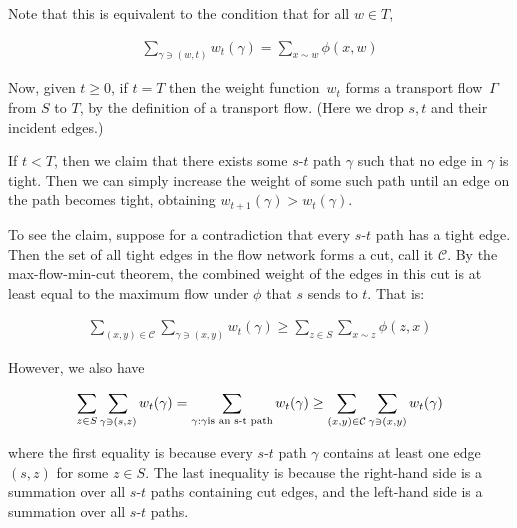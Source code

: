 \documentclass[10pt,a4paper]{article}
\begin{document}
Note that this is equivalent to the condition that for all $w\in T$,\par


\[\begin{gathered}
\sum_{\gamma\ni(w,t)}w_{t}(\gamma)=\sum_{x\sim w}\phi(x,w)
\end{gathered}\]




Now, given $t\geq 0$, if $t=T$ then the weight function $w_{t}$ forms a transport flow $\Gamma$ from $S$ to $T$, by the definition of a transport flow. (Here we drop $s,t$ and their incident edges.)\par




If $t<T$, then we claim that there exists some $s$-$t$ path $\gamma$ such that no edge in $\gamma$ is tight. Then we can simply increase the weight of some such path until an edge on the path becomes tight, obtaining $w_{t+1}(\gamma)>w_{t}(\gamma)$.\par




To see the claim, suppose for a contradiction that every $s$-$t$ path has a tight edge. Then the set of all tight edges in the flow network forms a cut, call it $\mathcal{C}$. By the max-flow-min-cut theorem, the combined weight of the edges in this cut is at least equal to the maximum flow under $\phi$ that $s$ sends to $t$. That is:\par


\[\begin{gathered}
\sum_{(x,y)\in\mathcal{C}}\sum_{\gamma\ni(x,y)}w_{t}(\gamma)\geq\sum_{z\in S}\sum_{x\sim z}\phi(z,x)
\end{gathered}\]


However, we also have\par


\[\begin{gathered}
\sum_{z\in S}\sum_{\gamma\ni(s,z)}w_{t}(\gamma)=\sum_{\gamma:\gamma\textnormal{is an s-t path}}w_{t}(\gamma)\geq\sum_{(x,y)\in\mathcal{C}}\sum_{\gamma\ni(x,y)}w_{t}(\gamma)
\end{gathered}\]


where the first equality is because every $s$-$t$ path $\gamma$ contains at least one edge $(s,z)$ for some $z\in S$. The last inequality is because the right-hand side is a summation over all $s$-$t$ paths containing cut edges, and the left-hand side is a summation over all $s$-$t$ paths.\par
\end{document}
